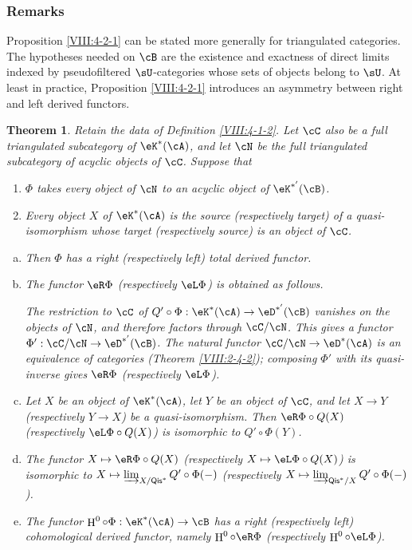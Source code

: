 \documentclass[12pt,oneside,english]{smfbook}
\DeclareMathOperator{\h}{H}
\newtheorem{theorem}[subsubsection]{Theorem}
\begin{document}
\subsubsection{Remarks}\label{VIII:4-2-2}

Proposition \ref{VIII:4-2-1} can be stated more generally for triangulated categories. The hypotheses needed on $\cB$ are the existence and exactness of direct limits indexed by pseudofiltered $\sU$-categories whose sets of objects belong to $\sU$. At least in practice, Proposition \ref{VIII:4-2-1} introduces an asymmetry between right and left derived functors.

\begin{theorem}\label{VIII:4-2-3} %
Retain the data of Definition \ref{VIII:4-1-2}. Let $\cC$ also be a full triangulated subcategory of $\eK^\ast(\cA)$, and let $\cN$ be the full triangulated subcategory of acyclic objects of $\cC$. Suppose that
\begin{enumerate}[(1)]
  \item $\Phi$ takes every object of $\cN$ to an acyclic object of $\eK^{\ast'}(\cB)$.
  \item Every object $X$ of $\eK^\ast(\cA)$ is the source (respectively target) of a quasi-isomorphism whose target (respectively source) is an object of $\cC$.
\end{enumerate}
\begin{enumerate}[a)]
  \item Then $\Phi$ has a right (respectively left) total derived functor.
  \item The functor $\eR\Phi$ (respectively $\eL\Phi$) is obtained as follows.

    The restriction to $\cC$ of $Q'\circ\Phi:\eK^\ast(\cA)\to\eD^{\ast'}(\cB)$ vanishes on the objects of $\cN$, and therefore factors through $\cC/\cN$. This gives a functor $\Phi':\cC/\cN\to\eD^{\ast'}(\cB)$. The natural functor $\cC/\cN\to\eD^\ast(\cA)$ is an equivalence of categories (Theorem \ref{VIII:2-4-2}); composing $\Phi'$ with its quasi-inverse gives $\eR\Phi$ (respectively $\eL\Phi$).
  \item Let $X$ be an object of $\eK^\ast(\cA)$, let $Y$ be an object of $\cC$, and let $X\to Y$ (respectively $Y\to X$) be a quasi-isomorphism. Then $\eR\Phi\circ Q(X)$ (respectively $\eL\Phi\circ Q(X)$) is isomorphic to $Q'\circ\Phi(Y)$.
  \item The functor $X\mapsto\eR\Phi\circ Q(X)$ (respectively $X\mapsto\eL\Phi\circ Q(X)$) is isomorphic to $X\mapsto\varinjlim_{X/\mathsf{Qis}^\ast}Q'\circ\Phi(-)$ (respectively $X\mapsto\varinjlim_{\mathsf{Qis}^\ast/X}Q'\circ\Phi(-)$).
  \item The functor $\h^0\circ\Phi:\eK^\ast(\cA)\to\cB$ has a right (respectively left) cohomological derived functor, namely $\h^0\circ\eR\Phi$ (respectively $\h^0\circ\eL\Phi$).
\end{enumerate}
\end{theorem}
\end{document}
